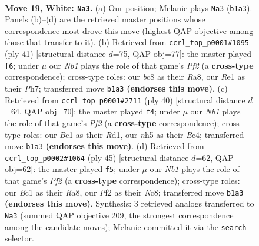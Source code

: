 \documentclass[11pt]{article}
\begin{document}
\clearpage

\begin{figure}[p]\centering
\begin{subfigure}{0.46\textwidth}\centering
\resizebox{\linewidth}{!}{%
\newchessgame
\chessboard[
  setfen={1rb2r2/pp4kp/6p1/2pBbp1n/7P/4P1P1/PP1PKP2/RNB1R3 w - - 3 19},
  showmover=false,
  pgfstyle=straightmove, color=movearrow, markmove={b1-a3}
]}
\caption{}
\end{subfigure}\hfill
\begin{subfigure}{0.46\textwidth}\centering
\resizebox{\linewidth}{!}{%
\newchessgame
\chessboard[
  setfen={r3kb1r/3p1ppp/p1b1p3/P7/3B1n2/1PN5/1P3PPP/R2R1BK1 b kq - 6 21},
  showmover=false,
  pgfstyle=straightmove, color=movearrow, markmove={f7-f6}
]}
\caption{}
\end{subfigure}
\\[4pt]
\begin{subfigure}{0.46\textwidth}\centering
\resizebox{\linewidth}{!}{%
\newchessgame
\chessboard[
  setfen={r2r1bk1/pp3ppp/2p1p3/7n/2BP4/PP2P1P1/5PKP/R1BR4 w - - 0 21},
  showmover=false,
  pgfstyle=straightmove, color=movearrow, markmove={f2-f4}
]}
\caption{}
\end{subfigure}\hfill
\begin{subfigure}{0.46\textwidth}\centering
\resizebox{\linewidth}{!}{%
\newchessgame
\chessboard[
  setfen={r1n1br2/1pk1bp1p/2p5/p5p1/P1NP1p2/1PP2B2/3B2PP/R3R1K1 b - - 4 23},
  showmover=false,
  pgfstyle=straightmove, color=movearrow, markmove={f7-f5}
]}
\caption{}
\end{subfigure}
\caption{\textbf{Move 19, White: \texttt{Na3}.} (a) Our position; Melanie plays \texttt{Na3} (\texttt{b1a3}). Panels (b)--(d) are the retrieved master positions whose correspondence most drove this move (highest QAP objective among those that transfer to it). (b) Retrieved from \texttt{ccrl\_top\_p0001\#1095} (ply 41) [structural distance $d$=75, QAP obj=77]: the master played \texttt{f6}; under $\mu$ our \emph{Nb1} plays the role of that game's \emph{Pf2} (a \textbf{cross-type} correspondence); cross-type roles: our \emph{b}c8 as their \emph{R}a8, our \emph{R}e1 as their \emph{P}h7; transferred move \texttt{b1a3} \textbf{(endorses this move)}. (c) Retrieved from \texttt{ccrl\_top\_p0001\#2711} (ply 40) [structural distance $d$=64, QAP obj=70]: the master played \texttt{f4}; under $\mu$ our \emph{Nb1} plays the role of that game's \emph{Pf2} (a \textbf{cross-type} correspondence); cross-type roles: our \emph{B}c1 as their \emph{R}d1, our \emph{n}h5 as their \emph{B}c4; transferred move \texttt{b1a3} \textbf{(endorses this move)}. (d) Retrieved from \texttt{ccrl\_top\_p0002\#1064} (ply 45) [structural distance $d$=62, QAP obj=62]: the master played \texttt{f5}; under $\mu$ our \emph{Nb1} plays the role of that game's \emph{Pf2} (a \textbf{cross-type} correspondence); cross-type roles: our \emph{B}c1 as their \emph{R}a8, our \emph{P}f2 as their \emph{N}c8; transferred move \texttt{b1a3} \textbf{(endorses this move)}. Synthesis: 3 retrieved analogs transferred to \texttt{Na3} (summed QAP objective 209, the strongest correspondence among the candidate moves); Melanie committed it via the \texttt{search} selector.}
\label{fig:thought-m36}
\end{figure}
\end{document}
